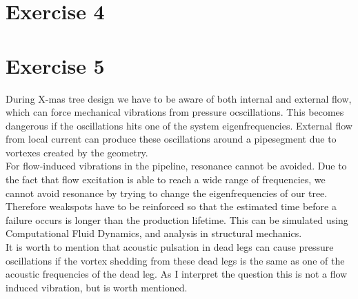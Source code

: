 \documentclass[a4paper,norsk]{article}
\begin{document}
\section*{Exercise 4}



\newpage
\section*{Exercise 5}
During X-mas tree design we have to be aware of both internal and external flow, which can force mechanical vibrations from pressure ocscillations. This becomes dangerous if the oscillations hits one of the system eigenfrequencies. External flow from local current can produce these oscillations around a pipesegment due to vortexes created by the geometry. \\
For flow-induced vibrations in the pipeline, resonance cannot be avoided. Due to the fact that flow excitation is able to reach a wide range of frequencies, we cannot avoid resonance by trying to change the eigenfrequencies of our tree. Therefore weakspots have to be reinforced so that the estimated time before a failure occurs is longer than the production lifetime. This can be simulated using Computational Fluid Dynamics, and analysis in structural mechanics. \\
It is worth to mention that acoustic pulsation in dead legs can cause pressure oscillations if the vortex shedding from these dead legs is the same as one of the acoustic frequencies of the dead leg. As I interpret the question this is not a flow induced vibration, but is worth mentioned.
\end{document}
